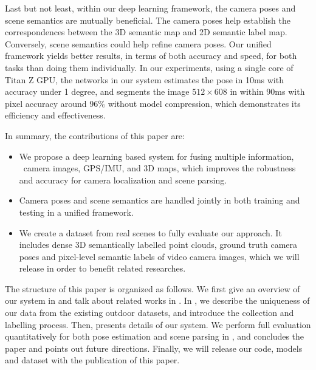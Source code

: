 Last but not least, within our deep learning framework, the camera poses and scene semantics are mutually beneficial. The camera poses help establish the correspondences between the 3D semantic map and 2D semantic label map. Conversely, scene semantics could help refine camera poses. Our unified framework yields better results, in terms of both accuracy and speed, for both tasks than doing them individually. In our experiments, using a single core of Titan Z GPU, the networks in our system estimates the pose in 10ms with accuracy under 1 degree, and segments the image $512 \times 608$ in within 90ms with pixel accuracy around 96$\%$ without model compression, which demonstrates its efficiency and effectiveness.

In summary, the contributions of this paper are:
\begin{itemize}
\vspace{-0.5\baselineskip}
    \setlength{\itemsep}{-2pt}
    \item We propose a deep learning based system for fusing multiple information, \ie~camera images, GPS/IMU, and 3D maps, which improves the robustness and accuracy for camera localization and scene parsing.
    \item Camera poses and scene semantics are handled jointly in both training and testing in a unified framework.
    \item We create a dataset from real scenes to fully evaluate our approach. It includes dense 3D semantically labelled point clouds, ground truth camera poses and pixel-level semantic labels of video camera images, which we will release in order to benefit related researches.
\vspace{-0.4\baselineskip}
\end{itemize}

The structure of this paper is organized as follows. We first give an overview of our system in  and talk about related works in . In , we describe the uniqueness of our data from the existing outdoor datasets, and introduce the collection and labelling process. 
Then,  presents details of our system. We perform full evaluation quantitatively for both pose estimation and scene parsing in , and  concludes the paper and points out future directions. Finally, we will release our code, models and dataset with the publication of this paper.

